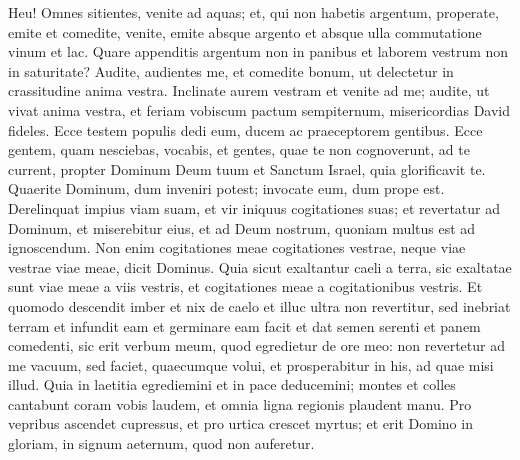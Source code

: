 \begin{biblechapter}  
\verse Heu! Omnes sitientes, venite ad aquas; et, qui non habetis argentum, properate, emite et comedite, venite, emite absque argento et absque ulla commutatione vinum et lac. 
\verse Quare appenditis argentum non in panibus et laborem vestrum non in saturitate? Audite, audientes me, et comedite bonum, ut delectetur in crassitudine anima vestra. 
\verse Inclinate aurem vestram et venite ad me; audite, ut vivat anima vestra, et feriam vobiscum pactum sempiternum, misericordias David fideles. 
\verse Ecce testem populis dedi eum, ducem ac praeceptorem gentibus. 
\verse Ecce gentem, quam nesciebas, vocabis, et gentes, quae te non cognoverunt, ad te current, propter Dominum Deum tuum et Sanctum Israel, quia glorificavit te. 
\verse Quaerite Dominum, dum inveniri potest; invocate eum, dum prope est. 
\verse Derelinquat impius viam suam, et vir iniquus cogitationes suas; et revertatur ad Dominum, et miserebitur eius, et ad Deum nostrum, quoniam multus est ad ignoscendum. 
\verse Non enim cogitationes meae cogitationes vestrae, neque viae vestrae viae meae, dicit Dominus. 
\verse Quia sicut exaltantur caeli a terra, sic exaltatae sunt viae meae a viis vestris, et cogitationes meae a cogitationibus vestris. 
\verse Et quomodo descendit imber et nix de caelo et illuc ultra non revertitur, sed inebriat terram et infundit eam et germinare eam facit et dat semen serenti et panem comedenti, 
\verse sic erit verbum meum, quod egredietur de ore meo: non revertetur ad me vacuum, sed faciet, quaecumque volui, et prosperabitur in his, ad quae misi illud. 
\verse Quia in laetitia egrediemini et in pace deducemini; montes et colles cantabunt coram vobis laudem, et omnia ligna regionis plaudent manu. 
\verse Pro vepribus ascendet cupressus, et pro urtica crescet myrtus; et erit Domino in gloriam, in signum aeternum, quod non auferetur. 
\end{biblechapter}

